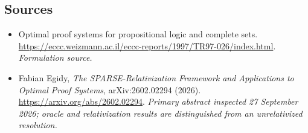 \documentclass[11pt]{article}
\begin{document}
\subsection{Sources}
\begin{itemize}
\item[S1]Optimal proof systems for propositional logic and complete sets.
\url{https://eccc.weizmann.ac.il/eccc-reports/1997/TR97-026/index.html}.
\textit{Formulation source.}
\item[E1]Fabian Egidy, \emph{The SPARSE-Relativization Framework and
Applications to Optimal Proof Systems}, arXiv:2602.02294 (2026).
\url{https://arxiv.org/abs/2602.02294}.
\textit{Primary abstract inspected 27 September 2026; oracle and
relativization results are distinguished from an unrelativized resolution.}
\end{itemize}
\end{document}
